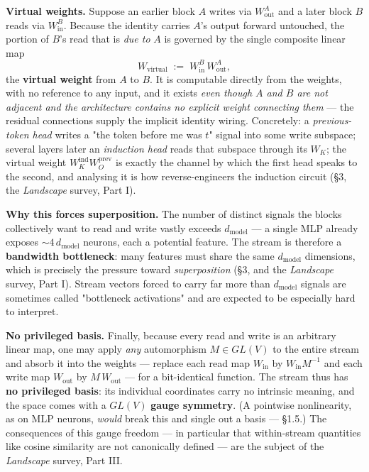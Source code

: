 \textbf{Virtual weights.} Suppose an earlier block $A$ writes via $W_{\text{out}}^A$ and a later block $B$ reads via $W_{\text{in}}^B$. Because the identity carries $A$'s output forward untouched, the portion of $B$'s read that is \emph{due to} $A$ is governed by the single composite linear map \[ W_{\text{virtual}} \;:=\; W_{\text{in}}^B\, W_{\text{out}}^A, \] the \textbf{virtual weight} from $A$ to $B$. It is computable directly from the weights, with no reference to any input, and it exists \emph{even though $A$ and $B$ are not adjacent and the architecture contains no explicit weight connecting them} --- the residual connections supply the implicit identity wiring. Concretely: a \emph{previous-token head} writes a "the token before me was $t$" signal into some write subspace; several layers later an \emph{induction head} reads that subspace through its $W_K$; the virtual weight $W_K^{\text{ind}} W_O^{\text{prev}}$ is exactly the channel by which the first head speaks to the second, and analysing it is how \textcite{framework} reverse-engineers the induction circuit (§3, the \emph{Landscape} survey, Part I).


\textbf{Why this forces superposition.} The number of distinct signals the blocks collectively want to read and write vastly exceeds $d_{\text{model}}$ --- a single MLP already exposes $\sim\!4\,d_{\text{model}}$ neurons, each a potential feature. The stream is therefore a \textbf{bandwidth bottleneck}: many features must share the same $d_{\text{model}}$ dimensions, which is precisely the pressure toward \emph{superposition} (§3, and the \emph{Landscape} survey, Part I). Stream vectors forced to carry far more than $d_{\text{model}}$ signals are sometimes called "bottleneck activations" and are expected to be especially hard to interpret.


\textbf{No privileged basis.} Finally, because every read and write is an arbitrary linear map, one may apply \emph{any} automorphism $M \in GL(V)$ to the entire stream and absorb it into the weights --- replace each read map $W_{\text{in}}$ by $W_{\text{in}} M^{-1}$ and each write map $W_{\text{out}}$ by $M\,W_{\text{out}}$ --- for a bit-identical function. The stream thus has \textbf{no privileged basis}: its individual coordinates carry no intrinsic meaning, and the space comes with a $GL(V)$ \textbf{gauge symmetry}. (A pointwise nonlinearity, as on MLP neurons, \emph{would} break this and single out a basis --- §1.5.) The consequences of this gauge freedom --- in particular that within-stream quantities like cosine similarity are not canonically defined --- are the subject of the \emph{Landscape} survey, Part III.


